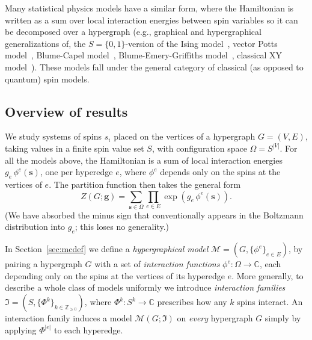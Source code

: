 \documentclass[11pt,reqno]{amsart}
\newcommand{\vecs}{\boldsymbol{s}}
\newcommand{\vecg}{\boldsymbol{g}}
\newcommand{\Mo}{\mathcal{M}}
\newcommand{\statespace}{\Omega}
\newcommand{\IFam}{\mathfrak{I}}
\newcommand{\sset}{spin value set }
\theoremstyle{plain}
\theoremstyle{definition}
\numberwithin{equation}{section}
\begin{document}
Many statistical physics models have a similar form,
where the Hamiltonian is written as a sum over local interaction energies between spin variables so it can be decomposed over a hypergraph (e.g., graphical and hypergraphical generalizations of, the $S=\{0,1\}$-version of the Ising model~\cite{jansma2025mereological}, vector Potts model~\cite{wu1982potts, deClercq2026}, Blume-Capel model~\cite{blume1966theory, capel1966possibility, waldorp2026blume}, Blume-Emery-Griffiths model~\cite{blume1971ising, armanetti2026inverse}, classical XY model~\cite{stanley1968dependence}).
These models fall under the general category of classical (as opposed to quantum) spin models.

\subsection{Overview of results}
\label{sec:overview}

We study systems of spins $s_i$ placed on the vertices of a hypergraph $G = (V,E)$, taking values in a finite \sset $S$, with configuration space $\statespace = S^{|V|}$. For all the models above, the Hamiltonian is a sum of local interaction energies $g_e\, \phi^e(\vecs)$, one per hyperedge $e$, where $\phi^e$ depends only on the spins at the vertices of $e$. The partition function then takes the general form
\[
    Z(G; \vecg) = \sum_{\vecs \in \statespace} \prod_{e \in E} \exp\!\left( g_e\, \phi^e(\vecs) \right).
\]
(We have absorbed the minus sign that conventionally appears in the Boltzmann distribution into $g_e$; this loses no generality.)

In Section~\ref{sec:mcdef} we define
a \emph{hypergraphical model} $\Mo = (G, \{\phi^e\}_{e \in E})$, by pairing a hypergraph $G$ with a set of \emph{interaction functions} $\phi^e \colon \statespace \to \mathbb{C}$, each depending only on the spins at the vertices of its hyperedge $e$.
More generally,
to describe a whole class of models uniformly we introduce \emph{interaction families} $\IFam = (S, \{\Phi^k\}_{k \in \mathbb{Z}_{\geq 0}})$, where $\Phi^k \colon S^k \to \mathbb{C}$ prescribes how any $k$ spins interact. An interaction family induces a model $\Mo(G; \IFam)$ on \emph{every} hypergraph $G$ simply by applying $\Phi^{|e|}$ to each hyperedge.
\end{document}
